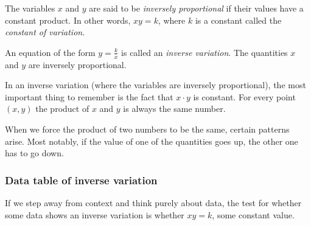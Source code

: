 \begin{boxeddef}
The variables $x$ and $y$ are said to be \textit{inversely proportional} if their values have a constant product. In other words, $xy = k$, where $k$ is a constant called the \textit{constant of variation}.

An equation of the form $y = \frac{k}{x}$ is called an \textit{inverse variation}. The quantities $x$ and $y$ are inversely proportional.
\end{boxeddef}

In an inverse variation (where the variables are inversely proportional), the most important thing to remember is the fact that $x \cdot y$ is constant. For every point $(x, y)$ the product of $x$ and $y$ is always the same number.

When we force the product of two numbers to be the same, certain patterns arise. Most notably, if the value of one of the quantities goes up, the other one has to go down.

%

\subsubsection{Data table of inverse variation}

If we step away from context and think purely about data, the test for whether some data shows an inverse variation is whether $xy = k$, some constant value.

